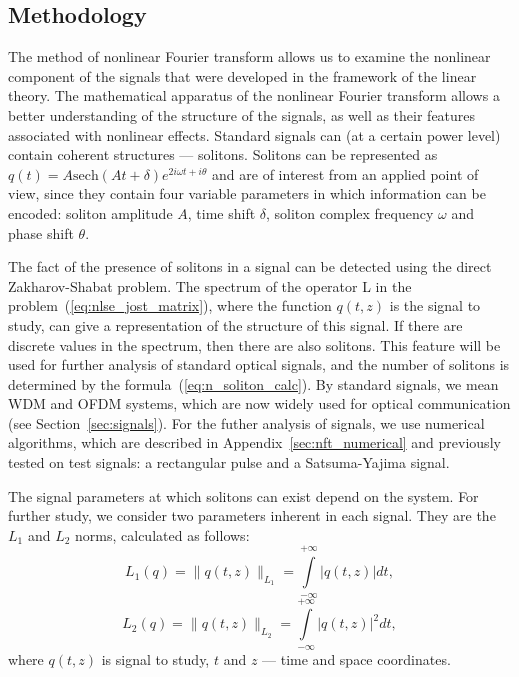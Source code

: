 \subsection{Methodology}
\label{sec:soliton_method}

The method of nonlinear Fourier transform allows us to examine the nonlinear component of the signals that were developed in the framework of the linear theory.
The mathematical apparatus of the nonlinear Fourier transform allows a better understanding of the structure of the signals, as well as their features associated with nonlinear effects.
Standard signals can (at a certain power level) contain coherent structures — solitons. Solitons can be represented as $q(t) = A \mathrm{sech} (At + \delta) e^{2 i \omega t + i \theta}$ and are of interest from an applied point of view, since they contain four variable parameters in which information can be encoded: 
soliton amplitude $A$, time shift $\delta$, soliton complex frequency $\omega$ and phase shift $\theta$. 

The fact of the presence of solitons in a signal can be detected using the 
direct Zakharov-Shabat problem. The spectrum of the operator 
L in the problem~(\ref{eq:nlse_jost_matrix}), where the function $q (t, z)$ 
is the signal to study, can give a representation of the structure of this signal. 
If there are discrete values in the spectrum, then there are also solitons. 
This feature will be used for further analysis of standard optical signals, 
and the number of solitons is determined by the formula~(\ref{eq:n_soliton_calc}). 
By standard signals, we mean WDM and OFDM systems, which are now widely used for optical communication (see Section~\ref{sec:signals}).
For the futher analysis of signals, we use numerical algorithms, 
which are described in Appendix~\ref{sec:nft_numerical} 
and previously tested on test signals: a rectangular pulse and a Satsuma-Yajima signal.



The signal parameters at which solitons can exist depend on the system.
For further study, we consider two parameters inherent in each signal. 
They are the $L_1$ and $L_2$ norms, calculated as follows:
\begin{equation}
    L_1(q) = \| q(t,z) \|_{L_1} = \int\limits_{-\infty}^{+\infty} |q(t,z)| dt {,}
    \label{eq:l1_n}
\end{equation}
\begin{equation}
    L_2(q) = \| q(t,z) \|_{L_2} = \int\limits_{-\infty}^{+\infty} |q(t,z)|^2 dt {,}
    \label{eq:l2_n}
\end{equation}
where $q(t,z)$ is signal to study, $t$ and $z$ --- time and space coordinates.



